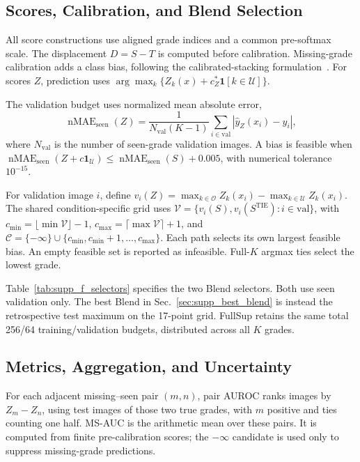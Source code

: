 \subsection{Scores, Calibration, and Blend Selection}
\label{sec:supp_calibration_protocol}

All score constructions use aligned grade indices and a common pre-softmax scale.
The displacement $D=S-T$ is computed before calibration.
Missing-grade calibration adds a class bias, following the calibrated-stacking formulation~\cite{chao2016gzsl}.
For scores $Z$, prediction uses
$\arg\max_k\{Z_k(x)+c_Z^*\mathbf1[k\in\mathcal U]\}$.

The validation budget uses normalized mean absolute error,
\begin{equation}
\operatorname{nMAE}_{\mathrm{seen}}(Z)
=
\frac{1}{N_{\mathrm{val}}(K-1)}
\sum_{i\in\mathrm{val}}
|\hat y_Z(x_i)-y_i|,
\label{eq:supp_f_nmae}
\end{equation}
where $N_{\mathrm{val}}$ is the number of seen-grade validation images.
A bias is feasible when
$\operatorname{nMAE}_{\mathrm{seen}}(Z+c\mathbf1_{\mathcal U})
\le
\operatorname{nMAE}_{\mathrm{seen}}(S)+0.005$,
with numerical tolerance $10^{-15}$.

For validation image $i$, define
$v_i(Z)=\max_{k\in\mathcal O}Z_k(x_i)-\max_{k\in\mathcal U}Z_k(x_i)$.
The shared condition-specific grid uses
$\mathcal V=\{v_i(S),v_i(S^{\mathrm{TIE}}):i\in\mathrm{val}\}$,
with
$c_{\min}=\lfloor\min\mathcal V\rfloor-1$,
$c_{\max}=\lceil\max\mathcal V\rceil+1$, and
$\mathcal C=\{-\infty\}\cup\{c_{\min},c_{\min}+1,\ldots,c_{\max}\}$.
Each path selects its own largest feasible bias.
An empty feasible set is reported as infeasible.
Full-$K$ argmax ties select the lowest grade.

Table~\ref{tab:supp_f_selectors} specifies the two Blend selectors.
Both use seen validation only.
The best Blend in Sec.~\ref{sec:supp_best_blend} is instead the retrospective test maximum on the 17-point grid.
FullSup retains the same total 256/64 training/validation budgets, distributed across all $K$ grades.


\subsection{Metrics, Aggregation, and Uncertainty}
\label{sec:supp_f_metrics}

For each adjacent missing--seen pair $(m,n)$, pair AUROC ranks images by $Z_m-Z_n$, using test images of those two true grades, with $m$ positive and ties counting one half.
MS-AUC is the arithmetic mean over these pairs.
It is computed from finite pre-calibration scores; the $-\infty$ candidate is used only to suppress missing-grade predictions.

